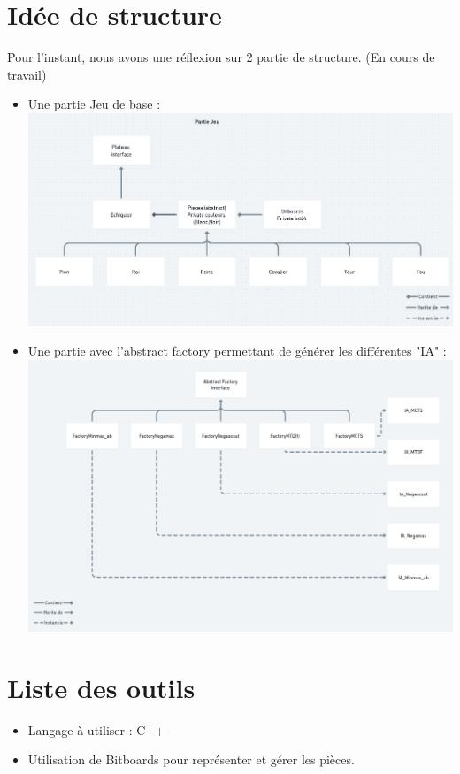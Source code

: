 \documentclass{article}
\begin{document}
\section{Idée de structure}
Pour l'instant, nous avons une réflexion sur 2 partie de structure. (En cours de travail) \newline
\begin{itemize}
    \item Une partie Jeu de base :\newline
    \includegraphics[scale = 0.3]{img/UML_part_gaming_chess.png}
    \newpage
    \item Une partie avec l'abstract factory permettant de générer les différentes "IA" : \newline
    \includegraphics[scale = 0.4]{img/Abstract_factory_IA_chess.png}
    
\end{itemize}
\section{Liste des outils}
\begin{itemize}
    \item Langage à utiliser : C++
    \item Utilisation de Bitboards pour représenter et gérer les pièces.
\end{itemize}
\end{document}
